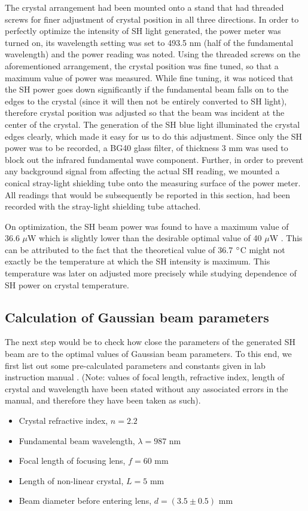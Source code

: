 The crystal arrangement had been mounted onto a stand that had threaded screws for finer adjustment of crystal position in all three directions. In order to perfectly optimize the intensity of SH light generated, the power meter was turned on, its wavelength setting was set to 493.5 nm (half of the fundamental wavelength) and the power reading was noted. Using the threaded screws on the aforementioned arrangement, the crystal position was fine tuned, so that a maximum value of power was measured. While fine tuning, it was noticed that the SH power goes down significantly if the fundamental beam falls on to the edges to the crystal (since it will then not be entirely converted to SH light), therefore crystal position was adjusted so that the beam was incident at the center of the crystal. The generation of the SH blue light illuminated the crystal edges clearly, which made it easy for us to do this adjustment. Since only the SH power was to be recorded, a BG40 glass filter, of thickness 3 mm was used to block out the infrared fundamental wave component. Further, in order to prevent any background signal from affecting the actual SH reading, we mounted a conical stray-light shielding tube onto the measuring surface of the power meter. All readings that would be subsequently be reported in this section, had been recorded with the stray-light shielding tube attached. 

On optimization, the SH beam power was found to have a maximum value of 36.6 $\mu$W which is slightly lower than the desirable optimal value of 40 $\mu$W \cite{UB}. This can be attributed to the fact that the theoretical value of 36.7 $\degree$C might not exactly be the temperature at which the SH intensity is maximum. This temperature was later on adjusted more precisely while studying dependence of SH power on crystal temperature.

\subsection{Calculation of Gaussian beam parameters}
The next step would be to check how close the parameters of the generated SH beam are to the optimal values of Gaussian beam parameters. To this end, we first list out some pre-calculated parameters and constants given in lab instruction manual \cite{UB}. (Note: values of focal length, refractive index, length of crystal and wavelength have been stated without any associated errors in the manual, and therefore they have been taken as such). 
\begin{itemize}
\item Crystal refractive index, $n=2.2$
\item Fundamental beam wavelength, $\lambda=987$ nm
\item Focal length of focusing lens, $f=60$ mm
\item Length of non-linear crystal, $L=5$ mm
\item Beam diameter before entering lens, $d=(3.5\pm 0.5)$ mm 
\end{itemize}

